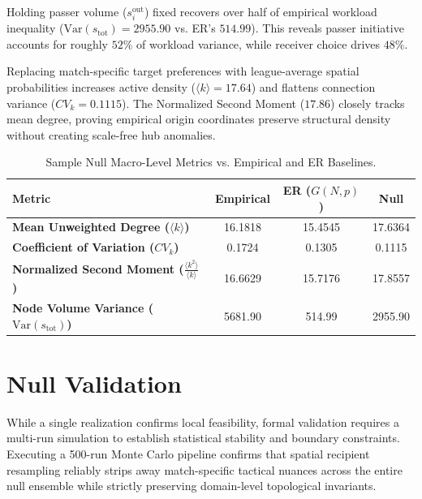 \documentclass[12pt, a4paper]{article}
\begin{document}
Holding passer volume ($s_i^{\text{out}}$) fixed recovers over half of empirical workload inequality ($\text{Var}(s_{\text{tot}}) = 2955.90$ vs. ER's $514.99$). This reveals passer initiative accounts for roughly $52\%$ of workload variance, while receiver choice drives $48\%$.

Replacing match-specific target preferences with league-average spatial probabilities increases active density ($\langle k \rangle = 17.64$) and flattens connection variance ($CV_k = 0.1115$). The Normalized Second Moment ($17.86$) closely tracks mean degree, proving empirical origin coordinates preserve structural density without creating scale-free hub anomalies.

\begin{table}[htbp]
    \centering
    \scriptsize
    \caption{Sample Null Macro-Level Metrics vs. Empirical and ER Baselines.}
    \label{tab:sample_null_metrics}
    \begin{tabularx}{0.85\textwidth}{X c c c}
        \toprule
        \textbf{Metric} & \textbf{Empirical} & \textbf{ER ($G(N,p)$)} & \textbf{Null} \\
        \midrule
        \textbf{Mean Unweighted Degree ($\langle k \rangle$)} & 16.1818 & 15.4545 & 17.6364 \\
        \addlinespace[3pt]
        \textbf{Coefficient of Variation ($CV_k$)} & 0.1724 & 0.1305 & 0.1115 \\
        \addlinespace[3pt]
        \textbf{Normalized Second Moment ($\frac{\langle k^2 \rangle}{\langle k \rangle}$)} & 16.6629 & 15.7176 & 17.8557 \\
        \addlinespace[3pt]
        \textbf{Node Volume Variance ($\text{Var}(s_{\text{tot}})$)} & 5681.90 & 514.99 & 2955.90 \\
        \bottomrule
    \end{tabularx}
\end{table}

\clearpage
\section{Null Validation}
\label{sec:null_validation}

While a single realization confirms local feasibility, formal validation requires a multi-run simulation to establish statistical stability and boundary constraints. Executing a 500-run Monte Carlo pipeline confirms that spatial recipient resampling reliably strips away match-specific tactical nuances across the entire null ensemble while strictly preserving domain-level topological invariants.
\end{document}
